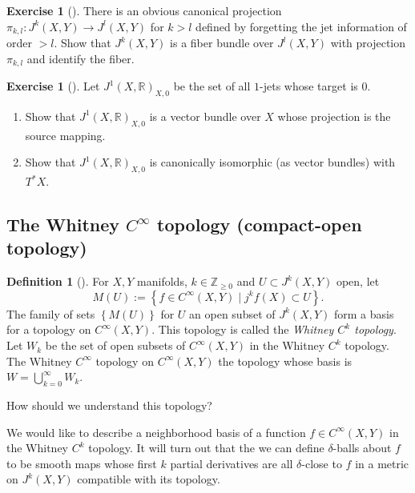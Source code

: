 \documentclass[reqno]{amsart}
\theoremstyle{definition}
\newtheorem{definition}[theorem]{Definition}
\newtheorem{exercise}[theorem]{Exercise}
\theoremstyle{remark}
\begin{document}
\begin{exercise}[]
    There is an obvious canonical projection
    $\pi_{k,l} \colon J^{k}(X,Y) \to 
    J^{l}(X,Y)$ for $k > l$ defined by forgetting the
    jet information of order $>l$. Show that
    $J^{k}(X,Y)$ is a fiber bundle over
    $J^{l}(X,Y)$ with projection $\pi_{k,l}$ and identify
    the fiber.
\end{exercise}

\begin{exercise}[]
    Let $J^{1}\left( X,\mathbb{R} \right)_{X,0}$ be
    the set of all $1$-jets whose target is $0$.
    \begin{enumerate}
        \item Show that $J^{1}(X,\mathbb{R})_{X,0}$ is a vector
            bundle over $X$ whose projection is
            the source mapping.
        \item Show that $J^{1}(X,\mathbb{R})_{X,0}$ is canonically
            isomorphic (as vector bundles) with
            $T^{*}X$.
    \end{enumerate}
\end{exercise}


\subsection{The Whitney $C^{\infty}$ topology (compact-open topology)}

\begin{definition}[]
    For $X,Y$ manifolds, $k \in \mathbb{Z}_{\ge 0}$ and
    $U \subset J^{k}(X,Y)$ open, let
    \[
    M(U) := \left\{ f \in C^{\infty}(X,Y)  \mid 
    j^{k}f(X) \subset U\right\} .
    \] 
    The family of sets
    $ \left\{ M(U) \right\} $ for
    $U$ an open subset of
     $J^{k}(X,Y)$ form a basis
     for a topology on $C^{\infty}(X,Y)$. This topology
     is called the \textit{Whitney $C^{k}$ topology}.
     Let $W_k$ be the set of open subsets
     of $C^{\infty}(X,Y)$ in the Whitney
     $C^{k}$ topology.\\
     The Whitney $C^{\infty}$ topology
     on $C^{\infty}(X,Y)$ the topology
     whose basis is
     $W = \bigcup_{k=0}^{\infty} W_k$.
\end{definition}



How should we understand this topology?

We would like to describe a neighborhood
basis of a function $f \in C^{\infty}(X,Y)$ in the
Whitney $C^{k}$ topology. It will turn out
that the we can define $\delta$-balls about
$f$ to be smooth maps whose first $k$ partial derivatives
are all $\delta$-close to $f$ in a metric
on $J^{k}(X,Y)$ compatible with its topology.\\
\end{document}

